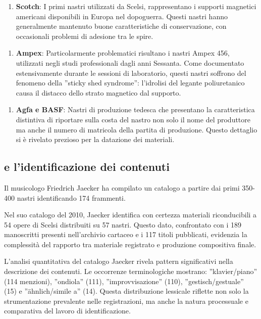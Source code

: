 \begin{enumerate}
    \item \textbf{Scotch}: I primi nastri utilizzati da Scelsi, rappresentano i supporti magnetici americani disponibili in Europa nel dopoguerra. Questi nastri hanno generalmente mantenuto buone caratteristiche di conservazione, con occasionali problemi di adesione tra le spire.
\end{enumerate}

\begin{enumerate}
    \item \textbf{Ampex}: Particolarmente problematici risultano i nastri Ampex 456, utilizzati negli studi professionali dagli anni Sessanta. Come documentato estensivamente durante le sessioni di laboratorio, questi nastri soffrono del fenomeno della ''sticky shed syndrome'': l'idrolisi del legante poliuretanico causa il distacco dello strato magnetico dal supporto.
\end{enumerate}

\begin{enumerate}
    \item \textbf{Agfa e BASF}: Nastri di produzione tedesca che presentano la caratteristica distintiva di riportare sulla costa del nastro non solo il nome del produttore ma anche il numero di matricola della partita di produzione. Questo dettaglio si è rivelato prezioso per la datazione dei materiali.
\end{enumerate}
\subsection{ e l'identificazione dei contenuti}
Il musicologo Friedrich Jaecker ha compilato un catalogo a partire dai primi 350-400 nastri identificando 174 frammenti.

Nel suo catalogo del 2010, Jaecker identifica con certezza materiali riconducibili a 54 opere di Scelsi distribuiti su 57 nastri. Questo dato, confrontato con i 189 manoscritti presenti nell'archivio cartaceo e i 117 titoli pubblicati, evidenzia la complessità del rapporto tra materiale registrato e produzione compositiva finale\cite[p. 47]{Bernardiniyyyy}.

L'analisi quantitativa del catalogo Jaecker rivela pattern significativi nella descrizione dei contenuti. Le occorrenze terminologiche mostrano: ''klavier/piano'' (114 menzioni), ''ondiola'' (111), ''improvvisazione'' (110), ''gestisch/gestuale'' (15) e ''ähnlich/simile a'' (14)\cite[p. 48]{Bernardini2020Quanti}. Questa distribuzione lessicale riflette non solo la strumentazione prevalente nelle registrazioni, ma anche la natura processuale e comparativa del lavoro di identificazione.

